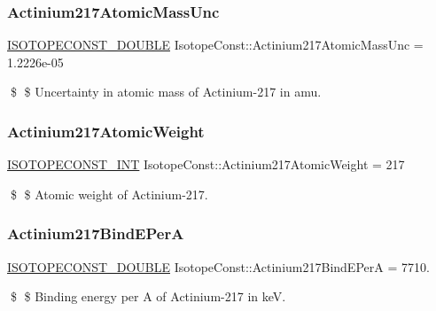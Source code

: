 \subsubsection{\texorpdfstring{Actinium217\+Atomic\+Mass\+Unc}{Actinium217AtomicMassUnc}}
{\footnotesize\ttfamily \mbox{\hyperlink{group___isotope_const-_macros_ga8f45a7272ce02c0b4c65c44636ed719a}{I\+S\+O\+T\+O\+P\+E\+C\+O\+N\+S\+T\+\_\+\+D\+O\+U\+B\+LE}} Isotope\+Const\+::\+Actinium217\+Atomic\+Mass\+Unc = 1.\+2226e-\/05}

\$ \$ Uncertainty in atomic mass of Actinium-\/217 in amu. \mbox{\label{group___isotope_const-_actinium-_ac217_ga96cb686adbbccf5cbf64eb01ada67fd0}} 
\subsubsection{\texorpdfstring{Actinium217\+Atomic\+Weight}{Actinium217AtomicWeight}}
{\footnotesize\ttfamily \mbox{\hyperlink{group___isotope_const-_macros_ga5f18360b3e99483a35c32d789e62621c}{I\+S\+O\+T\+O\+P\+E\+C\+O\+N\+S\+T\+\_\+\+I\+NT}} Isotope\+Const\+::\+Actinium217\+Atomic\+Weight = 217}

\$ \$ Atomic weight of Actinium-\/217. \mbox{\label{group___isotope_const-_actinium-_ac217_ga7600cba74cb709f912eac9a14d86f02f}} 
\subsubsection{\texorpdfstring{Actinium217\+Bind\+E\+PerA}{Actinium217BindEPerA}}
{\footnotesize\ttfamily \mbox{\hyperlink{group___isotope_const-_macros_ga8f45a7272ce02c0b4c65c44636ed719a}{I\+S\+O\+T\+O\+P\+E\+C\+O\+N\+S\+T\+\_\+\+D\+O\+U\+B\+LE}} Isotope\+Const\+::\+Actinium217\+Bind\+E\+PerA = 7710.}

\$ \$ Binding energy per A of Actinium-\/217 in keV. \mbox{\label{group___isotope_const-_actinium-_ac217_ga6e1b539deb4e64fc9f396de9a118b757}} 
